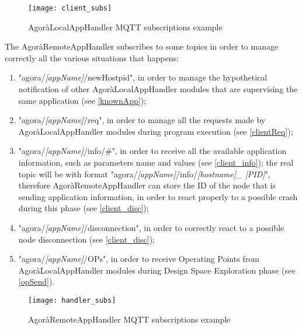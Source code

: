 \begin{figure}[H]

    \centering
    \texttt{[image: client\_subs]}
    \caption{AgoràLocalAppHandler MQTT subscriptions example}
    
\end{figure}

The AgoràRemoteAppHandler subscribes to some topics in order to manage correctly all the various situations that happens:

\begin{enumerate}

    \item "agora/\textit{[appName]}/newHostpid", in order to manage the hypothetical notification of other AgoràLocalAppHandler modules that are supervising the same application (see \ref{knownApp});
    
    \item "agora/\textit{[appName]}/req", in order to manage all the requests made by AgoràLocalAppHandler modules during program execution (see \ref{clientReq});
    
    \item "agora/\textit{[appName]}/info/\#", in order to receive all the available application information, such as parameters name and values (see \ref{client_info}); the real topic will be with format "agora\slash{}\textit{[appName]}\slash{}info\slash{}\textit{[host\-name]\_ [PID]}", therefore AgoràRemoteAppHandler can store the ID of the node that is sending application information, in order to react properly to a possible crash during this phase (see \ref{client_disc});
    
    \item "agora/\textit{[appName]}/disconnection", in order to correctly react to a possible node disconnection (see \ref{client_disc});
    
    \item "agora/\textit{[appName]}/OPs", in order to receive Operating Points from AgoràLocalAppHandler modules during Design Space Exploration phase (see \ref{opSend}).

\end{enumerate}

\begin{figure}[H]

    \centering
    \texttt{[image: handler\_subs]}
    \caption{AgoràRemoteAppHandler MQTT subscriptions example}
    
\end{figure}


